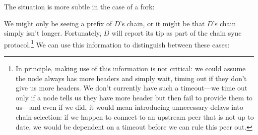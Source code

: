 The situation is more subtle in the case of a fork:
%
\begin{center}
\end{center}
%
We might only be seeing a prefix of $D$'s chain, or it might be that $D$'s chain
simply isn't longer. Fortunately, $D$ will report its tip as part of the chain
sync protocol.\footnote{In principle, making use of this information is not
critical: we could assume the node always has more headers and simply wait,
timing out if they don't give us more headers. We don't currently have such a
timeout---we time out only if a node tells us they have more header but then
fail to provide them to us---and even if we did, it would mean introducing
unnecessary delays into chain selection: if we happen to connect to an upstream
peer that is not up to date, we would be dependent on a timeout before we can
rule this peer out.} We can use this information to distinguish between these
cases:
%
